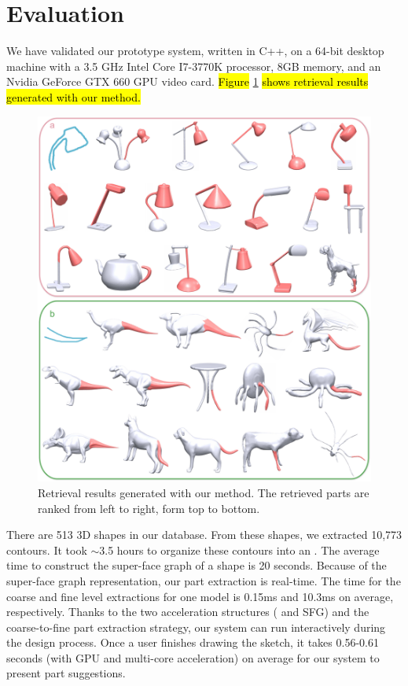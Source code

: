 

\section{Evaluation}

We have validated our prototype system, written in C++, on a 64-bit desktop machine with a 3.5 GHz Intel Core I7-3770K processor, 8GB memory, and an Nvidia GeForce GTX 660 GPU video card. \hl{Figure }\ref{fig:MoreRetrievalRes}\hl{ shows retrieval results generated with our method.}

\begin{figure}\centering
\includegraphics[width=1.05\linewidth]{./Material/MoreRetrievalRes.pdf}
\caption{Retrieval results generated with our method. The retrieved parts are ranked from left to right, form top to bottom.}\label{fig:MoreRetrievalRes}
\end{figure}

There are 513 3D shapes in our database. From these shapes, we extracted 10,773 contours. It took $\sim$3.5 hours to organize these contours into an {\RCKNNG}. The average time to construct the super-face graph of a shape is 20 seconds. Because of the super-face graph representation, our part extraction is real-time. The time for the coarse and fine level extractions for one model is 0.15ms and 10.3ms on average, respectively. Thanks to the two acceleration structures ({\RCKNNG} and SFG) and the coarse-to-fine part extraction strategy, our system can run interactively during the design process. Once a user finishes drawing the sketch, it takes 0.56-0.61 seconds (with GPU and multi-core acceleration) on average for our system to present part suggestions.

